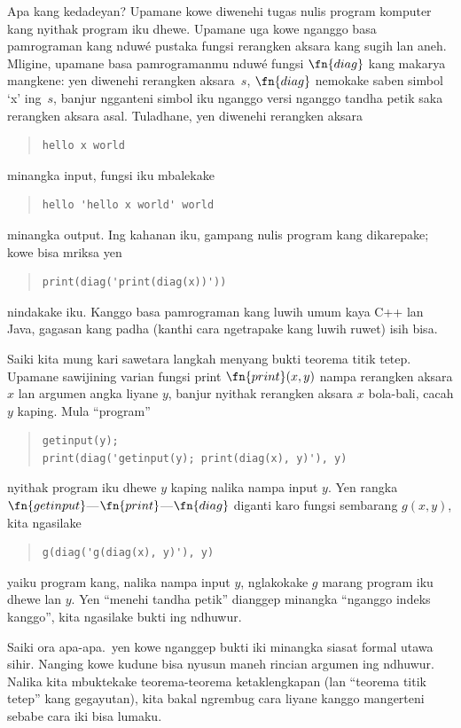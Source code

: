 \documentclass[../../../include/open-logic-section]{subfiles}
\begin{document}
\begin{explain}
Apa kang kedadeyan? Upamane kowe diwenehi
tugas nulis program komputer kang nyithak
program iku dhewe. Upamane uga kowe
nganggo basa pamrograman kang nduwé
pustaka fungsi rerangken aksara kang
sugih lan aneh. Mligine, upamane basa
pamrogramanmu nduwé fungsi $\fn{diag}$
kang makarya mangkene: yen diwenehi
rerangken aksara~$s$, $\fn{diag}$ nemokake
saben simbol `x' ing~$s$, banjur ngganteni
simbol iku nganggo versi nganggo tandha
petik saka rerangken aksara asal. Tuladhane,
yen diwenehi rerangken aksara
\begin{quote}
\begin{verbatim}
hello x world
\end{verbatim}
\end{quote}
minangka input, fungsi iku mbalekake
\begin{quote}
\begin{verbatim}
hello 'hello x world' world
\end{verbatim}
\end{quote}
minangka output. Ing kahanan iku,
gampang nulis program kang dikarepake;
kowe bisa mriksa yen
\begin{quote}
\begin{verbatim}
print(diag('print(diag(x))'))
\end{verbatim}
\end{quote}
nindakake iku. Kanggo basa pamrograman
kang luwih umum kaya C++ lan Java,
gagasan kang padha (kanthi cara
ngetrapake kang luwih ruwet) isih bisa.

Saiki kita mung kari sawetara langkah
menyang bukti teorema titik tetep.
Upamane sawijining varian fungsi print
$\fn{print}(x,y)$ nampa rerangken aksara $x$
lan argumen angka liyane $y$, banjur
nyithak rerangken aksara $x$ bola-bali,
cacah $y$ kaping. Mula ``program''
\begin{quote}
\begin{verbatim}
getinput(y);
print(diag('getinput(y); print(diag(x), y)'), y)
\end{verbatim}
\end{quote}
nyithak program iku dhewe $y$ kaping
nalika nampa input $y$. Yen rangka
$\fn{getinput}$---$\fn{print}$---$\fn{diag}$
diganti karo fungsi sembarang $g(x,y)$,
kita ngasilake
\begin{quote}
\begin{verbatim}
g(diag('g(diag(x), y)'), y)
\end{verbatim}
\end{quote}
yaiku program kang, nalika nampa input $y$,
nglakokake $g$ marang program iku dhewe
lan $y$. Yen ``menehi tandha petik''
dianggep minangka ``nganggo indeks kanggo'',
kita ngasilake bukti ing ndhuwur.

Saiki ora apa-apa.\ yen kowe nganggep
bukti iki minangka siasat formal utawa
sihir. Nanging kowe kudune bisa
nyusun maneh rincian argumen ing ndhuwur.
Nalika kita mbuktekake teorema-teorema
ketaklengkapan (lan ``teorema titik tetep''
kang gegayutan), kita bakal ngrembug
cara liyane kanggo mangerteni sebabe
cara iki bisa lumaku.
\end{explain}
\end{document}
